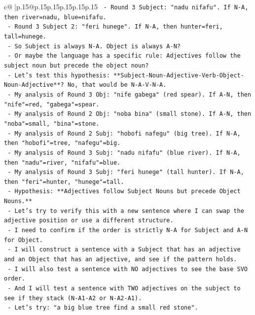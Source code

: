 \documentclass{article}
\begin{document}
{\begin{supertabular}{c@{$\;$}|p{.15\linewidth}@{}p{.15\linewidth}p{.15\linewidth}p{.15\linewidth}p{.15\linewidth}p{.15\linewidth}}
{{{\texttt{       {-} Round 3 Subject: "nadu nifafu". If N{-}A, then river=nadu, blue=nifafu.} \\
\texttt{       {-} Round 3 Subject 2: "feri hunege". If N{-}A, then hunter=feri, tall=hunege.} \\
\texttt{       {-} So Subject is always N{-}A. Object is always A{-}N?} \\
\texttt{       {-} Or maybe the language has a specific rule: Adjectives follow the subject noun but precede the object noun?} \\
\texttt{       {-} Let's test this hypothesis: **Subject{-}Noun{-}Adjective{-}Verb{-}Object{-}Noun{-}Adjective**? No, that would be N{-}A{-}V{-}N{-}A.} \\
\texttt{       {-} My analysis of Round 3 Obj: "nife gabega" (red spear). If A{-}N, then "nife"=red, "gabega"=spear.} \\
\texttt{       {-} My analysis of Round 2 Obj: "noba bina" (small stone). If A{-}N, then "noba"=small, "bina"=stone.} \\
\texttt{       {-} My analysis of Round 2 Subj: "hobofi nafegu" (big tree). If N{-}A, then "hobofi"=tree, "nafegu"=big.} \\
\texttt{       {-} My analysis of Round 3 Subj: "nadu nifafu" (blue river). If N{-}A, then "nadu"=river, "nifafu"=blue.} \\
\texttt{       {-} My analysis of Round 3 Subj: "feri hunege" (tall hunter). If N{-}A, then "feri"=hunter, "hunege"=tall.} \\
\texttt{       {-} Hypothesis: **Adjectives follow Subject Nouns but precede Object Nouns.**} \\
\texttt{       {-} Let's try to verify this with a new sentence where I can swap the adjective position or use a different structure.} \\
\texttt{       {-} I need to confirm if the order is strictly N{-}A for Subject and A{-}N for Object.} \\
\texttt{       {-} I will construct a sentence with a Subject that has an adjective and an Object that has an adjective, and see if the pattern holds.} \\
\texttt{       {-} I will also test a sentence with NO adjectives to see the base SVO order.} \\
\texttt{       {-} And I will test a sentence with TWO adjectives on the subject to see if they stack (N{-}A1{-}A2 or N{-}A2{-}A1).} \\
\texttt{       {-} Let's try: "a big blue tree find a small red stone".} \\
}}}
\end{supertabular}}
\end{document}
